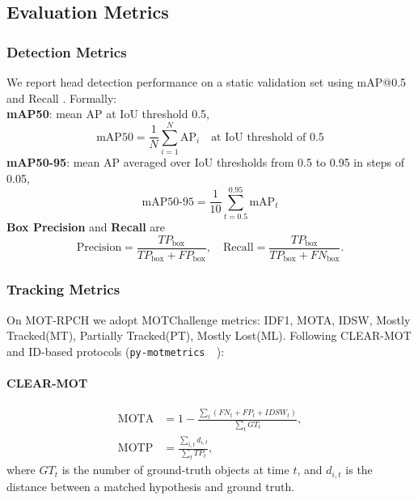 \subsection{Evaluation Metrics}

\subsubsection{Detection Metrics}
We report head detection performance on a static validation set using mAP@0.5 and Recall \cite{74_yolo11_Jocher_Ultralytics_YOLO_2023}. Formally:\\
\textbf{mAP50}: mean AP at IoU threshold 0.5,\\
\begin{equation}
\text{mAP50} = \frac{1}{N}\sum_{i=1}^{N}\text{AP}_i \quad \text{at IoU threshold of 0.5}
\end{equation}
\textbf{mAP50-95}: mean AP averaged over IoU thresholds from 0.5 to 0.95 in steps of 0.05,\\
\begin{equation}
\text{mAP50-95} = \frac{1}{10}\sum_{t=0.5}^{0.95}\text{mAP}_t
\end{equation}
\textbf{Box Precision} and \textbf{Recall} are\\
\begin{equation}
\text{Precision} = \frac{TP_{\text{box}}}{TP_{\text{box}} + FP_{\text{box}}}, \quad
\text{Recall} = \frac{TP_{\text{box}}}{TP_{\text{box}} + FN_{\text{box}}}.
\end{equation}

\subsubsection{Tracking Metrics}
On MOT-RPCH we adopt MOTChallenge metrics: IDF1, MOTA, IDSW, Mostly Tracked(MT), Partially Tracked(PT), Mostly Lost(ML). Following CLEAR-MOT and ID-based protocols (\texttt{py-motmetrics \cite{py-motmetrics} }):\\
\paragraph{CLEAR-MOT}
\begin{align}
\text{MOTA} &= 1 - \frac{\sum_t (FN_t + FP_t + IDSW_t)}{\sum_t GT_t}, \\
\text{MOTP} &= \frac{\sum_{i,t} d_{i,t}}{\sum_t TP_t},
\end{align}
where $GT_t$ is the number of ground-truth objects at time $t$, and $d_{i,t}$ is the distance between a matched hypothesis and ground truth.
